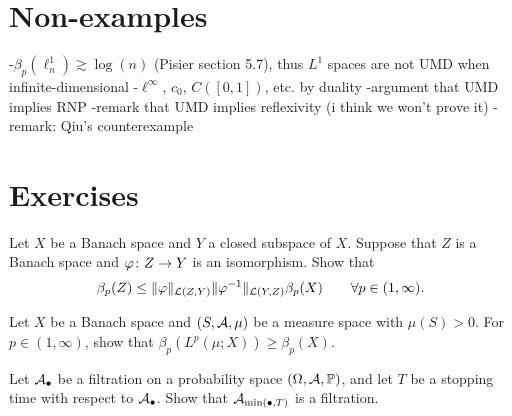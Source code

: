 \section{Non-examples}

-$\beta_{p}(\ell^{1}_{n}) \gtrsim \log(n)$ (Pisier section 5.7), thus $L^1$ spaces are not UMD when infinite-dimensional
-$\ell^\infty$, $c_{0}$, $C([0,1])$, etc. by duality
-argument that UMD implies RNP
-remark that UMD implies reflexivity (i think we won't prove it)
-remark: Qiu's counterexample

\section*{Exercises}

\begin{exercise}\label{ex:UMD-isomorphism}
  Let $X$ be a Banach space and $Y$ a closed subspace of $X$.
  Suppose that $Z$ is a Banach space and $\varphi \colon Z \rightarrow Y$ is an isomorphism.
  Show that 
  \begin{equation*}
    \beta_{p}(Z) \leq \|\varphi\|_{\mathcal{L}(Z,Y)} \|\varphi^{-1}\|_{\mathcal{L}(Y,Z)} \beta_{p}(X) \qquad \forall p \in (1,\infty).
  \end{equation*}
\end{exercise}

\begin{exercise}\label{ex:UMD-Lp-reverse}
  Let $X$ be a Banach space and $(S,\mathcal{A},\mu)$ be a measure space with $\mu(S) > 0$.
  For $p \in (1,\infty)$, show that $\beta_{p}(L^p(\mu;X)) \geq \beta_{p}(X)$.
\end{exercise}

\begin{exercise}\label{ex:stopped-filtration}
  Let $\mathcal{A}_{\bullet}$ be a filtration on a probability space $(\Omega,\mathcal{A},\mathbb{P})$, and let $T$ be a stopping time with respect to $\mathcal{A}_{\bullet}$.
  Show that $\mathcal{A}_{\min(\bullet,T)}$ is a filtration.
\end{exercise}

